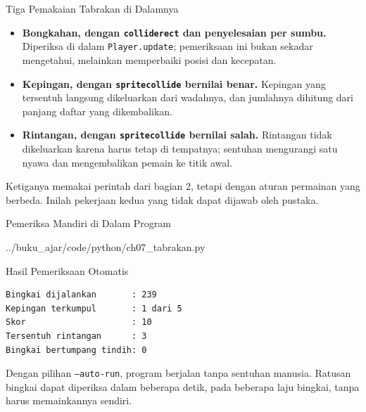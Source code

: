 \documentclass[aspectratio=169,10pt]{beamer}
\begin{document}
\begin{frame}{Tiga Pemakaian Tabrakan di Dalamnya}
\begin{itemize}
  \item \textbf{Bongkahan, dengan \texttt{colliderect} dan penyelesaian per
        sumbu.} Diperiksa di dalam \texttt{Player.update}; pemeriksaan ini
        bukan sekadar mengetahui, melainkan memperbaiki posisi dan kecepatan.
  \item \textbf{Kepingan, dengan \texttt{spritecollide} bernilai benar.}
        Kepingan yang tersentuh langsung dikeluarkan dari wadahnya, dan
        jumlahnya dihitung dari panjang daftar yang dikembalikan.
  \item \textbf{Rintangan, dengan \texttt{spritecollide} bernilai salah.}
        Rintangan tidak dikeluarkan karena harus tetap di tempatnya; sentuhan
        mengurangi satu nyawa dan mengembalikan pemain ke titik awal.
\end{itemize}
\vspace{0.16cm}
\begin{kotak}
Ketiganya memakai perintah dari bagian 2, tetapi dengan aturan permainan yang
berbeda. Inilah pekerjaan kedua yang tidak dapat dijawab oleh pustaka.
\end{kotak}
\end{frame}

\begin{frame}[fragile]{Pemeriksa Mandiri di Dalam Program}

  {../buku_ajar/code/python/ch07_tabrakan.py}
\end{frame}

\begin{frame}[fragile]{Hasil Pemeriksaan Otomatis}
\begin{lstlisting}[language={},numbers=none]
Bingkai dijalankan       : 239
Kepingan terkumpul       : 1 dari 5
Skor                     : 10
Tersentuh rintangan      : 3
Bingkai bertumpang tindih: 0
\end{lstlisting}
\vspace{0.12cm}
\begin{kotak}
Dengan pilihan \texttt{--auto-run}, program berjalan tanpa sentuhan manusia.
Ratusan bingkai dapat diperiksa dalam beberapa detik, pada beberapa laju
bingkai, tanpa harus memainkannya sendiri.
\end{kotak}
\end{frame}
\end{document}
